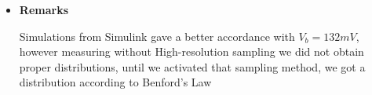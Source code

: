 \begin{itemize}
  \item \textbf{Remarks}

Simulations from Simulink gave a better accordance with $V_b=132mV$, however measuring without High-resolution sampling we did not obtain proper distributions, until we activated that sampling method, we got a distribution according to Benford's Law
 \end{itemize}
